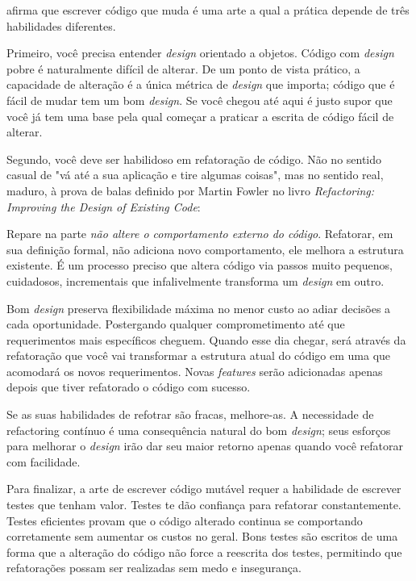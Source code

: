 
\cite{Sandi} afirma que escrever código que muda é uma arte a qual a prática depende de três habilidades diferentes.

Primeiro, você precisa entender \textit{design} orientado a objetos. Código com \textit{design} pobre é naturalmente difícil de alterar. De um ponto de vista prático, a capacidade de alteração é a única métrica de \textit{design} que importa; código que é fácil de mudar tem um bom \textit{design}. Se você chegou até aqui é justo supor que você já tem uma base pela qual começar a praticar a escrita de código fácil de alterar.

Segundo, você deve ser habilidoso em refatoração de código. Não no sentido casual de "vá até a sua aplicação e tire algumas coisas", mas no sentido real, maduro, à prova de balas definido por Martin Fowler no livro \textit{Refactoring: Improving the Design of Existing Code}\cite{Fowler1999}:


Repare na parte \textit{não altere o comportamento externo do código}. Refatorar, em sua definição formal, não adiciona novo comportamento, ele melhora a estrutura existente. É um processo preciso que altera código via passos muito pequenos, cuidadosos, incrementais que infalivelmente transforma um \textit{design} em outro.

Bom \textit{design} preserva flexibilidade máxima no menor custo ao adiar decisões a cada oportunidade. Postergando qualquer comprometimento até que requerimentos mais específicos cheguem. Quando esse dia chegar, será através da refatoração que você vai transformar a estrutura atual do código em uma que acomodará os novos requerimentos. Novas \textit{features} serão adicionadas apenas depois que tiver refatorado o código com sucesso.

Se as suas habilidades de refotrar são fracas, melhore-as. A necessidade de refactoring contínuo é uma consequência natural do bom \textit{design}; seus esforços para melhorar o \textit{design} irão dar seu maior retorno apenas quando você refatorar com facilidade.

Para finalizar, a arte de escrever código mutável requer a habilidade de escrever testes que tenham valor. Testes te dão confiança para refatorar constantemente. Testes eficientes provam que o código alterado continua se comportando corretamente sem aumentar os custos no geral. Bons testes são escritos de uma forma que a alteração do código não force a reescrita dos testes, permitindo que refatorações possam ser realizadas sem medo e insegurança.

